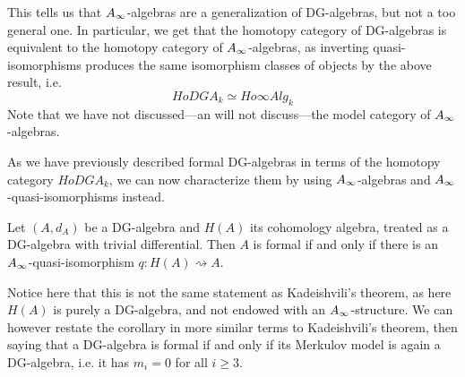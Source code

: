This tells us that $A_{\infty}$-algebras are a generalization of DG-algebras, but not a too general one. In particular, we get that the homotopy category of DG-algebras is equivalent to the homotopy category of $A_{\infty}$-algebras, as inverting quasi-isomorphisms produces the same isomorphism classes of objects by the above result, i.e. 
\begin{equation*}
	HoDGA_k \simeq Ho\infty Alg_k
\end{equation*}
Note that we have not discussed---an will not discuss---the model category of $A_{\infty}$-algebras. 

As we have previously described formal DG-algebras in terms of the homotopy category $HoDGA_k$, we can now characterize them by using $A_{\infty}$-algebras and $A_{\infty}$-quasi-isomorphisms instead. 

\begin{corollary}
\label{cor:formal_A_infinity-qi}
Let $(A, d_A)$ be a DG-algebra and $H(A)$ its cohomology algebra, treated as a DG-algebra with trivial differential. Then $A$ is formal if and only if there is an $A_{\infty}$-quasi-isomorphism $q\colon H(A)\rightsquigarrow A$. 
\end{corollary}

Notice here that this is not the same statement as Kadeishvili's theorem, as here $H(A)$ is purely a DG-algebra, and not endowed with an $A_{\infty}$-structure. We can however restate the corollary in more similar terms to Kadeishvili's theorem, then saying that a DG-algebra is formal if and only if its Merkulov model is again a DG-algebra, i.e. it has $m_i=0$ for all $i\geq 3$. 





